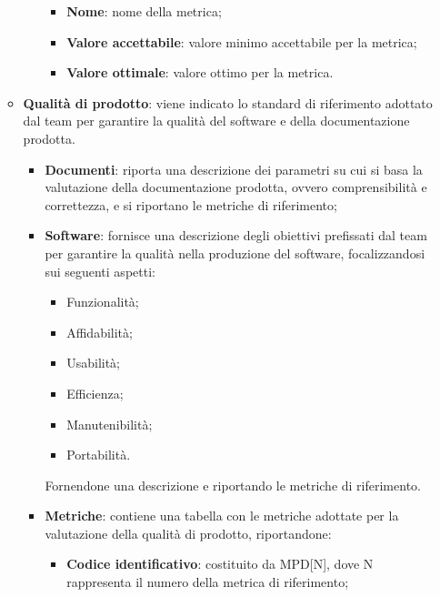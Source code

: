 \begin{itemize}
\begin{itemize}
\begin{itemize}
\begin{itemize}
                                  \item \textbf{Nome}: nome della metrica;
                                  \item \textbf{Valore accettabile}: valore minimo accettabile per la metrica;
                                  \item \textbf{Valore ottimale}: valore ottimo per la metrica.
                              \end{itemize}
                    \end{itemize}
              \item \textbf{Qualità di prodotto}: viene indicato lo standard di riferimento adottato dal team per garantire la qualità del software e della documentazione prodotta.
                    \begin{itemize}
                        \item \textbf{Documenti}: riporta una descrizione dei parametri su cui si basa la valutazione della documentazione prodotta, ovvero comprensibilità e correttezza, e si riportano le metriche di riferimento;
                        \item \textbf{Software}: fornisce una descrizione degli obiettivi prefissati dal team per garantire la qualità nella produzione del software, focalizzandosi sui seguenti aspetti:
                              \begin{itemize}
                                  \item Funzionalità;
                                  \item Affidabilità;
                                  \item Usabilità;
                                  \item Efficienza;
                                  \item Manutenibilità;
                                  \item Portabilità.
                              \end{itemize}
                              Fornendone una descrizione e riportando le metriche di riferimento.
                        \item \textbf{Metriche}: contiene una tabella con le metriche adottate per la valutazione della qualità di prodotto, riportandone:
                              \begin{itemize}
                                  \item \textbf{Codice identificativo}: costituito da MPD[N], dove N rappresenta il numero della metrica di riferimento;

\end{itemize}
\end{itemize}
\end{itemize}
\end{itemize}
